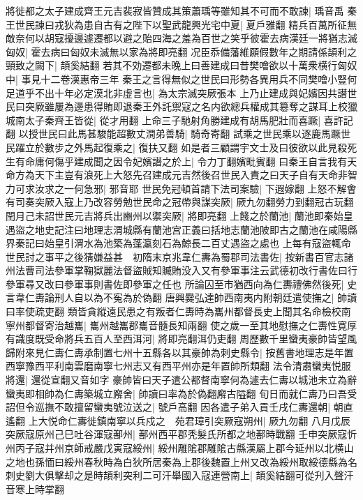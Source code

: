 將徙都之太子建成齊王元吉裴寂皆贊成其策蕭瑀等雖知其不可而不敢諫|{
	瑀音禹}
秦王世民諫曰戎狄為患自古有之陛下以聖武龍興光宅中夏|{
	夏戶雅翻}
精兵百萬所征無敵奈何以胡寇擾邊遽遷都以避之貽四海之羞為百世之笑乎彼霍去病漢廷一將猶志滅匈奴|{
	霍去病曰匈奴未滅無以家為將即亮翻}
况臣忝備藩維願假數年之期請係頡利之頸致之闕下|{
	頡奚結翻}
若其不効遷都未晚上曰善建成曰昔樊噲欲以十萬衆横行匈奴中|{
	事見十二卷漢惠帝三年}
秦王之言得無似之世民曰形勢各異用兵不同樊噲小豎何足道乎不出十年必定漠北非虛言也|{
	為太宗滅突厥張本}
上乃止建成與妃嬪因共譖世民曰突厥雖屢為邊患得賄即退秦王外託禦寇之名内欲總兵權成其簒奪之謀耳上校獵城南太子秦齊王皆從|{
	從才用翻}
上命三子馳射角勝建成有胡馬肥壯而喜蹶|{
	喜許記翻}
以授世民曰此馬甚駿能超數丈澗弟善騎|{
	騎奇寄翻}
試乘之世民乘以逐鹿馬蹶世民躍立於數步之外馬起復乘之|{
	復扶又翻}
如是者三顧謂宇文士及曰彼欲以此見殺死生有命庸何傷乎建成聞之因令妃嬪譖之於上|{
	令力丁翻嬪毗賓翻}
曰秦王自言我有天命方為天下主豈有浪死上大怒先召建成元吉然後召世民入責之曰天子自有天命非智力可求汝求之一何急邪|{
	邪音耶}
世民免冠頓首請下法司案驗|{
	下遐嫁翻}
上怒不解會有司奏突厥入寇上乃改容勞勉世民命之冠帶與謀突厥|{
	厥九勿翻勞力到翻冠古玩翻}
閏月己未詔世民元吉將兵出豳州以禦突厥|{
	將即亮翻}
上餞之於蘭池|{
	蘭池即秦始皇遇盜之地史記注曰地理志渭城縣有蘭池宫正義曰括地志蘭池陂即古之蘭池在咸陽縣界秦記曰始皇引渭水為池築為蓬瀛刻石為鯨長二百丈遇盜之處也}
上每有寇盜輒命世民討之事平之後猜嫌益甚　初隋末京兆韋仁夀為蜀郡司法書佐|{
	按新書百官志諸州法曹司法參軍掌鞠獄麗法督盜賊知贓賄没入又有參軍事注云武德初改行書佐曰行參軍尋又改曰參軍事則書佐即參軍之任也}
所論囚至市猶西向為仁夀禮佛然後死|{
	史言韋仁夀論刑人自以為不寃為於偽翻}
唐興爨弘達帥西南夷内附朝廷遣使撫之|{
	帥讀曰率使疏吏翻}
類皆貪縱遠民患之有叛者仁夀時為巂州都督長史上聞其名命檢校南寧州都督寄治越巂|{
	巂州越巂郡巂音髓長知兩翻}
使之歲一至其地慰撫之仁夀性寛厚有識度既受命將兵五百人至西洱河|{
	將即亮翻洱仍吏翻}
周歷數千里蠻夷豪帥皆望風歸附來見仁夀仁夀承制置七州十五縣各以其豪帥為刺史縣令|{
	按舊書地理志是年置西寧豫西平利南雲磨南寧七州志又有西平州亦是年置帥所類翻}
法令清肅蠻夷悦服將還|{
	還從宣翻又音如字}
豪帥皆曰天子遣公都督南寧何為遽去仁夀以城池未立為辭蠻夷即相帥為仁夀築城立廨舍|{
	帥讀曰率為於偽翻廨古隘翻}
旬日而就仁夀乃曰吾受詔但令巡撫不敢擅留蠻夷號泣送之|{
	號戶高翻}
因各遣子弟入貢壬戌仁夀還朝|{
	朝直遙翻}
上大悦命仁夀徙鎮南寧以兵戍之　苑君璋引突厥寇朔州|{
	厥九勿翻}
八月戊辰突厥寇原州己巳吐谷渾寇鄯州|{
	鄯州西平郡秃髮氏所都之地鄯時戰翻}
壬申突厥寇忻州丙子寇并州京師戒嚴戊寅寇綏州|{
	綏州雕隂郡雕隂古縣漢屬上郡今延州以北横山之地也孫愐曰綏州春秋時為白狄所居秦為上郡後魏置上州又改為綏州取綏德縣為名}
刺史劉大俱擊却之是時頡利突利二可汗舉國入寇連營南上|{
	頡奚結翻可從刋入聲汗音寒上時掌翻}
